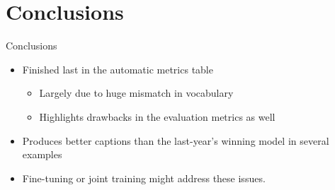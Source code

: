 \documentclass{beamer}
\newcommand{\mcCell}[1]{\multicolumn{1}{|c|}{#1}}
\begin{document}
\section{Conclusions}
\begin{frame}{Conclusions}
\begin{itemize}
    \item Finished last in the automatic metrics table 
       \begin{itemize}
           \item Largely due to huge mismatch in vocabulary
           \item Highlights drawbacks in the evaluation metrics as well
       \end{itemize}
    \item Produces better captions than the last-year's winning model in several examples
    \item Fine-tuning or joint training might address these issues.
\end{itemize}
\end{frame}
\end{document}
